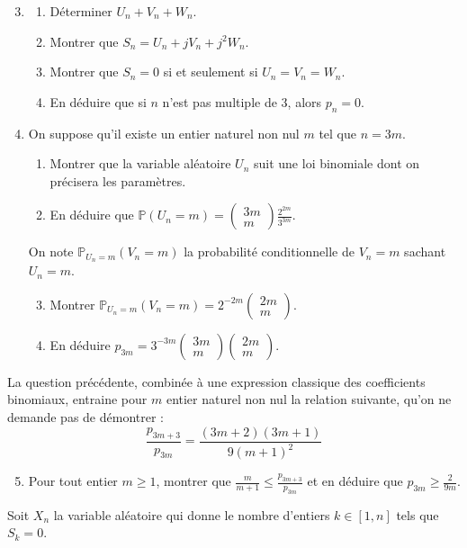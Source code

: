 \documentclass[landscape,twocolumn,leqno,a4paper,10pt]{report} %
\newcommand\n{\noindent}
\renewcommand{\geq}{\geqslant}
\renewcommand{\leq}{\leqslant}
\newcommand{\Prob}{\mathbb{P}}
\newcommand*{\binomial}[2]{%
  \ensuremath{ 
    \begin{pmatrix} 
      #2\\ 
      #1
    \end{pmatrix}}}				%
\renewcommand{\binom}{\binomial} 	%
\begin{document}
\begin{enumerate}\setcounter{enumi}{2}
	\item \begin{enumerate}
		\item Déterminer $U_{n}+V_{n}+W_{n}$.
		\item Montrer que $S_{n}=U_{n}+j V_{n}+j^{2} W_{n}$.
		\item Montrer que $S_{n}=0$ si et seulement si $U_{n}=V_{n}=W_{n}$.
		\item En déduire que si $n$ n'est pas multiple de 3, alors $p_{n}=0$.
	\end{enumerate}
	\item On suppose qu'il existe un entier naturel non nul $m$ tel que $n=3m$.
	\begin{enumerate}
		\item Montrer que la variable aléatoire $U_{n}$ suit une loi binomiale dont on précisera les paramètres.
		\item En déduire que $\Prob\left(U_{n}=m\right)=\binom{m}{3m} \frac{2^{2 m}}{3^{3 m}}$.
	\end{enumerate}
	On note $\Prob_{U_{n}=m}\left(V_{n}=m\right)$ la probabilité conditionnelle de $V_{n}=m$ sachant $U_{n}=m$.
	\begin{enumerate}\setcounter{enumii}{2}
		\item Montrer $\Prob_{U_{n}=m}\left(V_{n}=m\right)=2^{-2 m}\binom{m}{2m}$.
		\item En déduire $p_{3 m}=3^{-3 m}\binom{m}{3m}\binom{m}{2m}$.
	\end{enumerate}
\end{enumerate}

\n La question précédente, combinée à une expression classique des coefficients binomiaux, entraine pour $m$ entier naturel non nul la relation suivante, qu'on ne demande pas de démontrer :
$$\frac{p_{3 m+3}}{p_{3 m}}=\frac{(3 m+2)(3 m+1)}{9(m+1)^{2}}$$

\begin{enumerate}\setcounter{enumi}{4}
	\item Pour tout entier $m \geq 1$, montrer que $\frac{m}{m+1} \leq \frac{p_{3 m+3}}{p_{3 m}}$ et en déduire que $p_{3 m} \geq \frac{2}{9 m}$.
\end{enumerate}

\n Soit $X_{n}$ la variable aléatoire qui donne le nombre d'entiers $k \in[1, n]$ tels que $S_{k}=0$.
\end{document}
